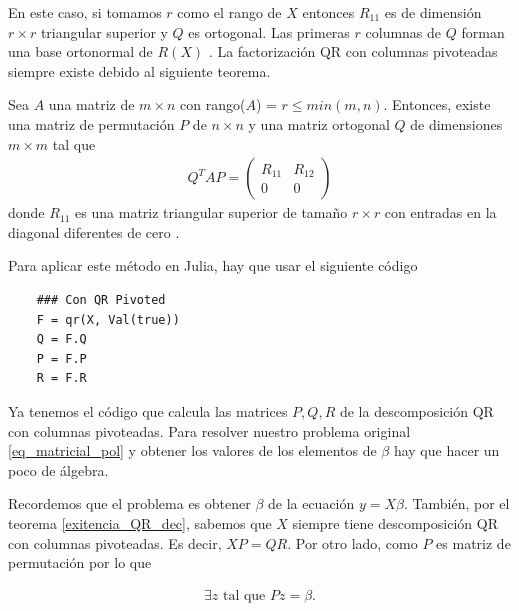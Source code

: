 En este caso, si tomamos $r$ como el rango de $X$ entonces $R_{11}$ es de dimensión $r \times r$ triangular superior y $Q$ es ortogonal. Las primeras $r$ columnas de $Q$ forman una base ortonormal de $R(X)$ \cite{numerical_linear_algebra}. La factorización QR con columnas pivoteadas  siempre existe debido al siguiente teorema.

\begin{theorem} \label{exitencia_QR_dec}
Sea $A$ una matriz de $m \times n$ con rango($A$) = $r \leq min (m, n)$. Entonces, existe una matriz de permutación $P$ de $n \times n$ y una matriz ortogonal $Q$ de dimensiones $m \times m$ tal que 
\begin{equation*}
\begin{aligned}
Q^{T}AP = 
\begin{pmatrix}
R_{11} & R_{12} \\
   0      & 0
\end{pmatrix}
\end{aligned}
\end{equation*}
donde $R_{11}$ es una matriz triangular superior de tamaño $r \times r$ con entradas en la diagonal diferentes de cero \cite[p.~532]{numerical_linear_algebra}.
\end{theorem}


Para aplicar este método en Julia, hay que usar el siguiente código

\begin{verbatim}
    ### Con QR Pivoted
    F = qr(X, Val(true))
    Q = F.Q
    P = F.P
    R = F.R
\end{verbatim}



Ya tenemos el código que calcula las matrices $P, Q, R$ de la descomposición QR con columnas pivoteadas. Para resolver nuestro problema original \ref{eq_matricial_pol} y obtener los valores de los elementos de $\beta$ hay que hacer un poco de álgebra. 



Recordemos que el problema es obtener $\beta$ de la ecuación $y = X \beta$. También, por el teorema \ref{exitencia_QR_dec}, sabemos que $X$ siempre tiene descomposición QR con columnas pivoteadas. Es decir, $XP = QR$. Por otro lado, como $P$ es matriz de permutación por lo que

\begin{equation*}
    \begin{aligned}
    \exists z \text{ tal que } Pz = \beta .
    \end{aligned}
\end{equation*}

